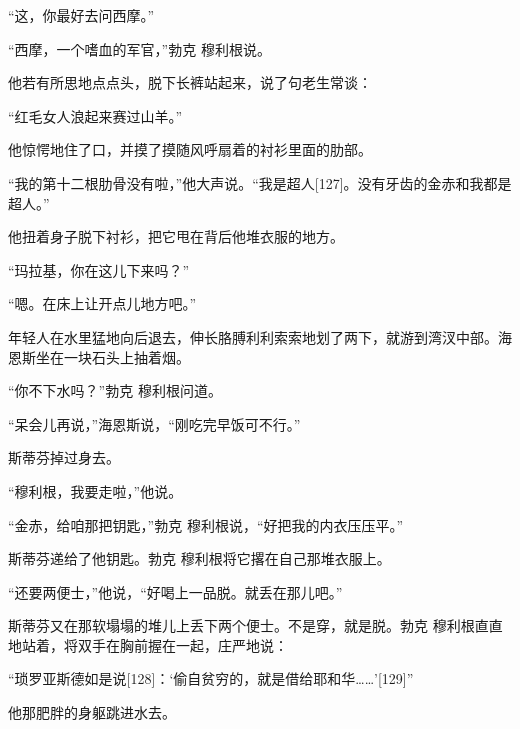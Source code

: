 \documentclass{article}
\begin{document}
“这，你最好去问西摩。”



“西摩，一个嗜血的军官，”勃克 \cdot 穆利根说。



他若有所思地点点头，脱下长裤站起来，说了句老生常谈：



“红毛女人浪起来赛过山羊。”



他惊愕地住了口，并摸了摸随风呼扇着的衬衫里面的肋部。



“我的第十二根肋骨没有啦，”他大声说。“我是超人[127]。没有牙齿的金赤和我都是超人。”



他扭着身子脱下衬衫，把它甩在背后他堆衣服的地方。



“玛拉基，你在这儿下来吗？”



“嗯。在床上让开点儿地方吧。”



年轻人在水里猛地向后退去，伸长胳膊利利索索地划了两下，就游到湾汊中部。海恩斯坐在一块石头上抽着烟。



“你不下水吗？”勃克 \cdot 穆利根问道。



“呆会儿再说，”海恩斯说，“刚吃完早饭可不行。”



斯蒂芬掉过身去。



“穆利根，我要走啦，”他说。



“金赤，给咱那把钥匙，”勃克 \cdot 穆利根说，“好把我的内衣压压平。”



斯蒂芬递给了他钥匙。勃克 \cdot 穆利根将它撂在自己那堆衣服上。



“还要两便士，”他说，“好喝上一品脱。就丢在那儿吧。”



斯蒂芬又在那软塌塌的堆儿上丢下两个便士。不是穿，就是脱。勃克 \cdot 穆利根直直地站着，将双手在胸前握在一起，庄严地说：



“琐罗亚斯德如是说[128]：‘偷自贫穷的，就是借给耶和华……’[129]”



他那肥胖的身躯跳进水去。
\end{document}
